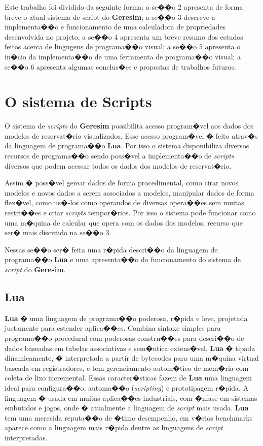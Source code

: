 \documentclass[dissertacao,modelo1,brazil]{ThesisPUC}
\newcommand{\script}{\emph{script}}
\begin{document}
Este trabalho foi dividido da seguinte forma: a se��o 2 apresenta de forma breve o atual sistema
de script do \textbf{Geresim}; a se��o 3 descreve a implementa��o e funcionamento de uma calculadora de 
propriedades desenvolvida no projeto; a se��o 4 apresenta um breve resumo dos estudos feitos
acerca de lingugens de programa��o visual; a se��o 5 apresenta  o in�cio da 
implementa��o de uma ferramenta de programa��o visual; a se��o 6 apresenta algumas conclus�es
e propostas de trabalhos futuros.


\chapter{O sistema de Scripts}

O sistema de \emph{scripts} do \textbf{Geresim} possibilita acesso program�vel aos dados dos 
modelos de reservat�rio visualizados. Esse acesso program�vel � feito atrav�s da 
linguagem de programa��o \textbf{Lua}. Por isso o sistema disponibiliza diversos recursos
de programa��o sendo poss�vel a implementa��o de \emph{scripts} diversos que podem
acessar todos os dados dos modelos de reservat�rio.

Assim � poss�vel gerear dados de forma procedimental, como cirar novos
modelos e novos dados a serem associados a modelos, manipular dados de forma 
flex�vel, como us�-los como operandos de diversas opera��es sem muitas restri��es
e criar \emph{scripts} tempor�rios. Por isso o sistema pode funcionar como uma m�quina
de calcular que opera com os dados dos modelos, recurso que ser� mais discutido
na se��o 3.

Nessas se��o ser� feita uma r�pida descri��o da linguagem de programa��o \textbf{Lua} e 
uma apresenta��o do funcionamento do sistema de \script{} do \textbf{Geresim}.

\section{Lua}


\textbf{Lua} � uma linguagem de programa��o poderosa, r�pida e leve, projetada justamente para estender aplica��es.
Combina sintaxe simples para programa��o procedural com poderosas constru��es para descri��o de dados 
baseadas em tabelas associativas e sem�ntica extens�vel. \textbf{Lua} � tipada dinamicamente, � interpretada a 
partir de bytecodes para uma m�quina virtual baseada em registradores, e tem gerenciamento autom�tico 
de mem�ria com coleta de lixo incremental. Essas caracter�sticas fazem de \textbf{Lua} uma linguagem ideal 
para configura��o, automa��o (\emph{scripting}) e prototipagem r�pida. A linguagem
� usada em muitas aplica��es
industriais, com �nfase em sistemas embutidos e jogos, onde � atualmente a linguagem de
\script{} mais usada. \textbf{Lua} tem uma merecida reputa��o de �timo desempenho, em v�rios benchmarks 
aparece como a linguagem mais r�pida dentre as linguagens de \script{} interpretadas.
\cite{Lua}
\end{document}
